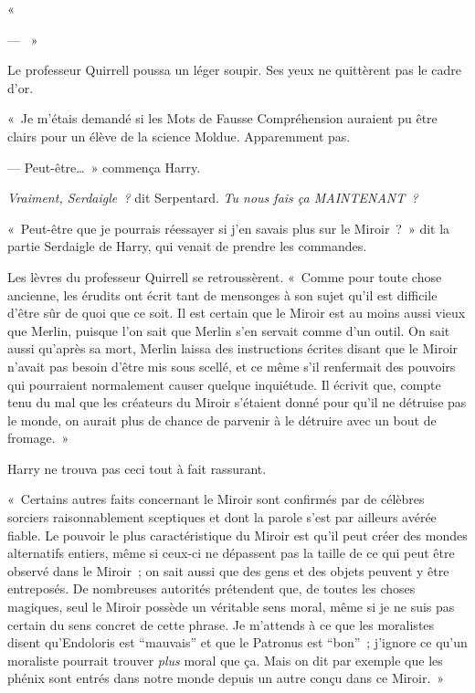 «~

--- ~»

Le professeur Quirrell poussa un léger soupir.
Ses yeux ne quittèrent pas le cadre d'or.

«~Je m'étais demandé si les Mots de Fausse Compréhension auraient pu être clairs pour un élève de la science Moldue.
Apparemment pas.

--- Peut-être…~»
commença Harry.

\emph{Vraiment, Serdaigle~?} dit Serpentard.
\emph{Tu nous fais ça MAINTENANT~?}

«~Peut-être que je pourrais réessayer si j'en savais plus sur le Miroir~?~»
dit la partie Serdaigle de Harry, qui venait de prendre les commandes.

Les lèvres du professeur Quirrell se retroussèrent.
«~Comme pour toute chose ancienne, les érudits ont écrit tant de mensonges à son sujet qu'il est difficile d'être sûr de quoi que ce soit.
Il est certain que le Miroir est au moins aussi vieux que Merlin, puisque l'on sait que Merlin s'en servait comme d'un outil.
On sait aussi qu'après sa mort, Merlin laissa des instructions écrites disant que le Miroir n'avait pas besoin d'être mis sous scellé, et ce même s'il renfermait des pouvoirs qui pourraient normalement causer quelque inquiétude.
Il écrivit que, compte tenu du mal que les créateurs du Miroir s'étaient donné pour qu'il ne détruise pas le monde, on aurait plus de chance de parvenir à le détruire avec un bout de fromage.~»

Harry ne trouva pas ceci tout à fait rassurant.

«~Certains autres faits concernant le Miroir sont confirmés par de célèbres sorciers raisonnablement sceptiques et dont la parole s'est par ailleurs avérée fiable.
Le pouvoir le plus caractéristique du Miroir est qu'il peut créer des mondes alternatifs entiers, même si ceux-ci ne dépassent pas la taille de ce qui peut être observé dans le Miroir~; on sait aussi que des gens et des objets peuvent y être entreposés.
De nombreuses autorités prétendent que, de toutes les choses magiques, seul le Miroir possède un véritable sens moral, même si je ne suis pas certain du sens concret de cette phrase.
Je m'attends à ce que les moralistes disent qu'Endoloris est “mauvais” et que le Patronus est “bon”~; j'ignore ce qu'un moraliste pourrait trouver \emph{plus} moral que ça.
Mais on dit par exemple que les phénix sont entrés dans notre monde depuis un autre conçu dans ce Miroir.~»

